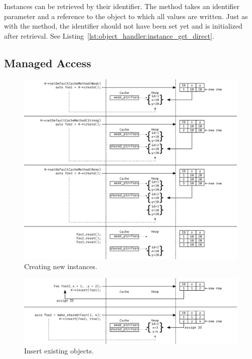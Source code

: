 

Instances can be retrieved by their identifier. The  method takes an identifier parameter and a reference to the object to which all values are written. Just as with the  method, the identifier should not have been set yet and is initialized after retrieval. See Listing~\ref{lst:object_handler:instance_get_direct}.



\subsection{Managed Access}

\begin{figure}[H]
	\includegraphics[width=1\textwidth]{figures/create.pdf}
	\caption{Creating new instances.}\label{fig:object_handler:create}
\end{figure}

\begin{figure}[H]
	\includegraphics[width=1\textwidth]{figures/insert.pdf}
	\caption{Insert existing objects.}\label{fig:object_handler:insert}
\end{figure}
